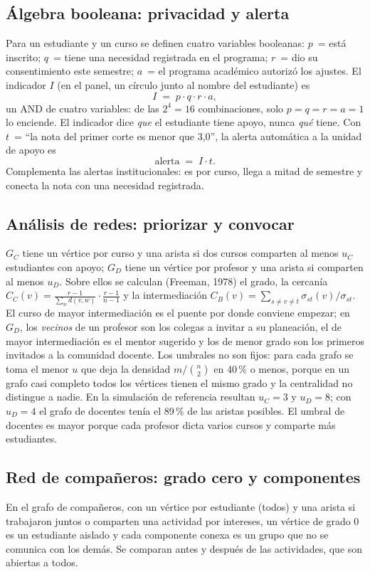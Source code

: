 \documentclass[12pt,letterpaper]{article}
\begin{document}
\subsection{Álgebra booleana: privacidad y alerta}
Para un estudiante y un curso se definen cuatro variables booleanas: $p$~= está inscrito; $q$~= tiene una necesidad registrada en el programa; $r$~= dio su consentimiento este semestre; $a$~= el programa académico autorizó los ajustes. El indicador $I$ (en el panel, un círculo junto al nombre del estudiante) es
\[
I \;=\; p\cdot q\cdot r\cdot a ,
\]
un AND de cuatro variables: de las $2^4=16$ combinaciones, solo $p=q=r=a=1$ lo enciende. El indicador dice \emph{que} el estudiante tiene apoyo, nunca \emph{qué} tiene. Con $t$~= ``la nota del primer corte es menor que 3,0'', la alerta automática a la unidad de apoyo es
\[
\text{alerta} \;=\; I \cdot t .
\]
Complementa las alertas institucionales: es por curso, llega a mitad de semestre y conecta la nota con una necesidad registrada.

\subsection{Análisis de redes: priorizar y convocar}
$G_C$ tiene un vértice por curso y una arista si dos cursos comparten al menos $u_C$ estudiantes con apoyo; $G_D$ tiene un vértice por profesor y una arista si comparten al menos $u_D$. Sobre ellos se calculan (Freeman, 1978) el grado, la cercanía $C_C(v)=\frac{r-1}{\sum_w d(v,w)}\cdot\frac{r-1}{n-1}$ y la intermediación $C_B(v)=\sum_{s\neq v\neq t}\sigma_{st}(v)/\sigma_{st}$. El curso de mayor intermediación es el puente por donde conviene empezar; en $G_D$, los \emph{vecinos} de un profesor son los colegas a invitar a su planeación, el de mayor intermediación es el mentor sugerido y los de menor grado son los primeros invitados a la comunidad docente. Los umbrales no son fijos: para cada grafo se toma el menor $u$ que deja la densidad $m/\binom{n}{2}$ en 40\,\% o menos, porque en un grafo casi completo todos los vértices tienen el mismo grado y la centralidad no distingue a nadie. En la simulación de referencia resultan $u_C=3$ y $u_D=8$; con $u_D=4$ el grafo de docentes tenía el 89\,\% de las aristas posibles. El umbral de docentes es mayor porque cada profesor dicta varios cursos y comparte más estudiantes.

\subsection{Red de compañeros: grado cero y componentes}
En el grafo de compañeros, con un vértice por estudiante (todos) y una arista si trabajaron juntos o comparten una actividad por intereses, un vértice de grado 0 es un estudiante aislado y cada componente conexa es un grupo que no se comunica con los demás. Se comparan antes y después de las actividades, que son abiertas a todos.
\end{document}
